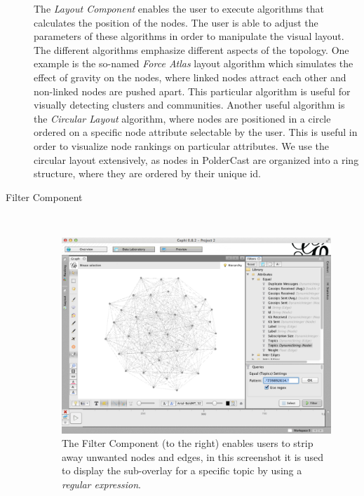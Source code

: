 \begin{description}
    The \emph{Layout Component} enables the user to execute algorithms that
    calculates the position of the nodes. The user is able to adjust the
    parameters of these algorithms in order to manipulate the visual
    layout. The different algorithms emphasize different aspects of the
    topology. One example is the so-named \emph{Force Atlas} layout algorithm which
    simulates the effect of gravity on the nodes, where linked nodes
    attract each other and non-linked nodes are pushed apart. This
    particular algorithm is useful for visually detecting clusters and
    communities. Another useful algorithm is the \emph{Circular Layout}
    algorithm, where nodes are positioned in a circle ordered on a
    specific node attribute selectable by the user. This is useful in order
    to visualize node rankings on particular attributes. We use the
    circular layout extensively, as nodes in PolderCast are organized
    into a ring structure, where they are ordered by their unique id.

\item[Filter Component] \hfill \\

    \begin{figure}[h!]
        \centering
        \includegraphics[width=\linewidth]{figures/gui_filter}
        \caption{The Filter Component (to the right) enables users to strip away
            unwanted nodes and edges, in this screenshot it is used to
            display the sub-overlay for a specific topic by using a
            \emph{regular expression}.}
        \label{fig:ranking_table}
    \end{figure}


\end{description}
